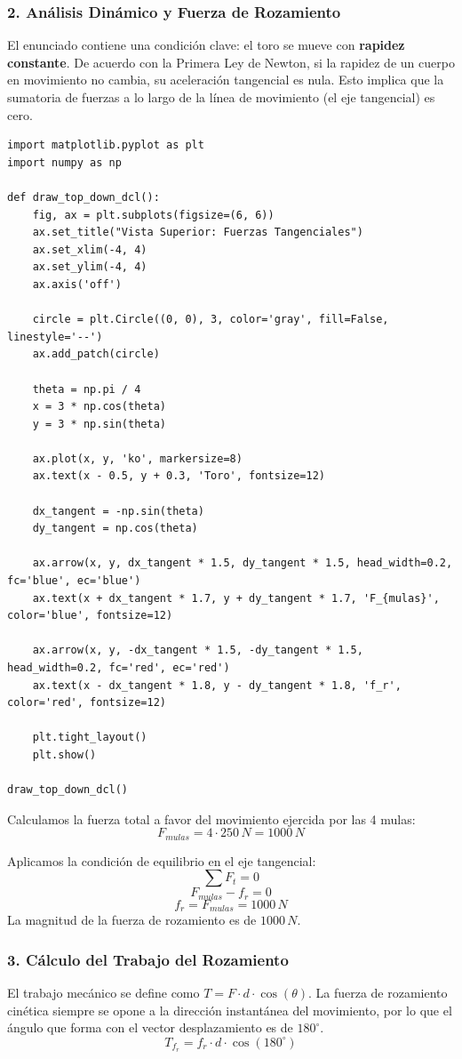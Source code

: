 \documentclass[12pt, a4paper]{article}
\begin{document}
\subsubsection*{2. Análisis Dinámico y Fuerza de Rozamiento}
El enunciado contiene una condición clave: el toro se mueve con \textbf{rapidez constante}. De acuerdo con la Primera Ley de Newton, si la rapidez de un cuerpo en movimiento no cambia, su aceleración tangencial es nula. Esto implica que la sumatoria de fuerzas a lo largo de la línea de movimiento (el eje tangencial) es cero.

\begin{lstlisting}
import matplotlib.pyplot as plt
import numpy as np

def draw_top_down_dcl():
    fig, ax = plt.subplots(figsize=(6, 6))
    ax.set_title("Vista Superior: Fuerzas Tangenciales")
    ax.set_xlim(-4, 4)
    ax.set_ylim(-4, 4)
    ax.axis('off')
    
    circle = plt.Circle((0, 0), 3, color='gray', fill=False, linestyle='--')
    ax.add_patch(circle)
    
    theta = np.pi / 4
    x = 3 * np.cos(theta)
    y = 3 * np.sin(theta)
    
    ax.plot(x, y, 'ko', markersize=8)
    ax.text(x - 0.5, y + 0.3, 'Toro', fontsize=12)
    
    dx_tangent = -np.sin(theta)
    dy_tangent = np.cos(theta)
    
    ax.arrow(x, y, dx_tangent * 1.5, dy_tangent * 1.5, head_width=0.2, fc='blue', ec='blue')
    ax.text(x + dx_tangent * 1.7, y + dy_tangent * 1.7, 'F_{mulas}', color='blue', fontsize=12)
    
    ax.arrow(x, y, -dx_tangent * 1.5, -dy_tangent * 1.5, head_width=0.2, fc='red', ec='red')
    ax.text(x - dx_tangent * 1.8, y - dy_tangent * 1.8, 'f_r', color='red', fontsize=12)

    plt.tight_layout()
    plt.show()

draw_top_down_dcl()
\end{lstlisting}

Calculamos la fuerza total a favor del movimiento ejercida por las 4 mulas:
$$F_{mulas} = 4 \cdot 250 \, \si{N} = 1000 \, \si{N}$$

Aplicamos la condición de equilibrio en el eje tangencial:
$$\sum F_t = 0$$
$$F_{mulas} - f_r = 0$$
$$f_r = F_{mulas} = 1000 \, \si{N}$$
La magnitud de la fuerza de rozamiento es de $1000 \, \si{N}$.

\subsubsection*{3. Cálculo del Trabajo del Rozamiento}
El trabajo mecánico se define como $T = F \cdot d \cdot \cos(\theta)$.
La fuerza de rozamiento cinética siempre se opone a la dirección instantánea del movimiento, por lo que el ángulo que forma con el vector desplazamiento es de $180^\circ$.
$$T_{f_r} = f_r \cdot d \cdot \cos(180^\circ)$$
\end{document}
